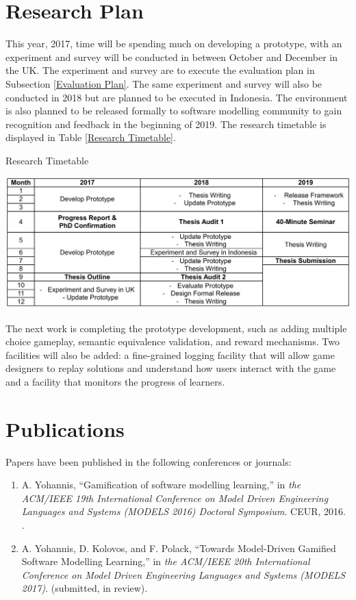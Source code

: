 \documentclass[10pt, a4paper]{report} \usepackage[titletoc]{appendix}
\begin{document}
\chapter{Research Plan}
\label{Research Plan}
This year, 2017, time will be spending much on developing a prototype, with an experiment and survey will be conducted in between October and December in the UK. The experiment and survey are to execute the evaluation plan in Subsection \ref{Evaluation Plan}. The same experiment and survey will also be conducted in 2018 but are planned to be executed in Indonesia. The environment is also planned to be released formally to software modelling community to gain recognition and feedback in the beginning of 2019. The research timetable is displayed in Table \ref{Research Timetable}. 

\begin {table}[th]
\caption {Research Timetable} 
\includegraphics[width=\textwidth]{timetable}
\label{Research Timetable}
\end{table}

The next work is completing the prototype development, such as adding multiple choice gameplay, semantic equivalence validation, and reward mechanisms. Two facilities will also be added: a fine-grained logging facility that will allow game designers to replay solutions and understand how users interact with the game and a facility that monitors the progress of learners. 


\chapter{Publications}
\label{Publications}
Papers have been published in the following conferences or journals: 
\begin{enumerate}
 \item A. Yohannis, ``Gamification of software modelling learning,'' in
 \textit{the ACM/IEEE 19th International Conference on Model Driven Engineering Languages and Systems (MODELS 2016) Doctoral Symposium}. CEUR, 2016. \cite{Yohannis2016}.
 \item A. Yohannis, D. Kolovos, and F. Polack, ``Towards Model-Driven Gamified Software Modelling Learning,'' in \textit{the ACM/IEEE 20th International Conference on Model Driven Engineering Languages and Systems (MODELS 2017)}. (submitted, in review).
\end{enumerate}







\end{document}
